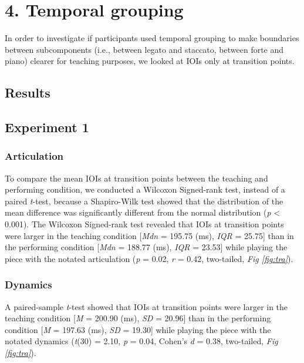 \documentclass[
  man,floatsintext]{apa6}
\begin{document}
\clearpage

\hypertarget{temporal-grouping}{%
\section{4. Temporal grouping}\label{temporal-grouping}}

In order to investigate if participants used temporal grouping to make boundaries between subcomponents (i.e., between legato and staccato, between forte and piano) clearer for teaching purposes, we looked at IOIs only at transition points.

\hypertarget{results-3}{%
\subsection{Results}\label{results-3}}

\hypertarget{experiment-1-4}{%
\subsection{Experiment 1}\label{experiment-1-4}}

\hypertarget{articulation-4}{%
\subsubsection{Articulation}\label{articulation-4}}

To compare the mean IOIs at transition points between the teaching and performing condition, we conducted a Wilcoxon Signed-rank test, instead of a paired \emph{t}-test, because a Shapiro-Wilk test showed that the distribution of the mean difference was significantly different from the normal distribution (\emph{p} \textless{} 0.001). The Wilcoxon Signed-rank test revealed that IOIs at transition points were larger in the teaching condition {[}\emph{Mdn} = 195.75 (ms), \emph{IQR} = 25.75{]} than in the performing condition {[}\emph{Mdn} = 188.77 (ms), \emph{IQR} = 23.53{]} while playing the piece with the notated articulation (\emph{p} = 0.02, \emph{r} = 0.42, two-tailed, \emph{Fig \ref{fig:tra}}).

\hypertarget{dynamics-4}{%
\subsubsection{Dynamics}\label{dynamics-4}}

A paired-sample \emph{t}-test showed that IOIs at transition points were larger in the teaching condition {[}\emph{M} = 200.90 (ms), \emph{SD} = 20.96{]} than in the performing condition {[}\emph{M} = 197.63 (ms), \emph{SD} = 19.30{]} while playing the piece with the notated dynamics (\emph{t}(30) = 2.10, \emph{p} = 0.04, Cohen's \emph{d} = 0.38, two-tailed, \emph{Fig \ref{fig:tra}}).
\end{document}
